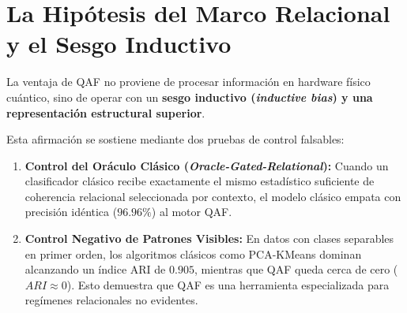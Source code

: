 \documentclass[11pt,a4paper,oneside]{report}
\begin{document}
\section{La Hipótesis del Marco Relacional y el Sesgo Inductivo}
La ventaja de QAF no proviene de procesar información en hardware físico cuántico, sino de operar con un \textbf{sesgo inductivo (\emph{inductive bias}) y una representación estructural superior}.

Esta afirmación se sostiene mediante dos pruebas de control falsables:
\begin{enumerate}
    \item \textbf{Control del Oráculo Clásico (\emph{Oracle-Gated-Relational}):} Cuando un clasificador clásico recibe exactamente el mismo estadístico suficiente de coherencia relacional seleccionada por contexto, el modelo clásico empata con precisión idéntica ($96.96\%$) al motor QAF.
    \item \textbf{Control Negativo de Patrones Visibles:} En datos con clases separables en primer orden, los algoritmos clásicos como PCA-KMeans dominan alcanzando un índice ARI de $0.905$, mientras que QAF queda cerca de cero ($ARI \approx 0$). Esto demuestra que QAF es una herramienta especializada para regímenes relacionales no evidentes.
\end{enumerate}
\end{document}
